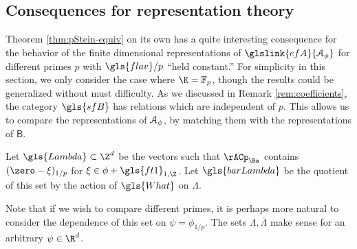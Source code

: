 \subsection{Consequences for representation theory}
\label{sec:cons-repr-theory}
Theorem \ref{thm:pStein-equiv} on its own has a quite interesting
consequence for  the behavior of the finite dimensional
representations of $\glslink{efA}{\EuScript{A}_\phi}$ for
different primes $p$ with  $\gls{flav}/p$  ``held constant.''  For simplicity in this section, we only consider the case where $\K=\mathbb{F}_p$, though the results could be
generalized without must difficulty.  As we discussed in Remark \ref{rem:coefficients}, the
category $\gls{sfB}$ has relations which are independent of $p$.
This allows us to compare the representations of $\EuScript{A}_\phi$,
by matching them with the representations of $\mathsf{B}.$ 


\begin{definition}\label{def:Lambda}
  Let $\gls{Lambda}\subset \Z^{d}$ be the vectors such that $\rACp_{\Ba}$
  contains $(\zero-\xi)_{1/p}$ for $\xi\in \phi+\gls{ft1}_{1,\Z}$.   Let $\gls{barLambda}$ be the quotient of this set by
  the action of $\gls{What}$ on $\Lambda$.
\end{definition}
Note that if we wish to compare different primes, it is perhaps more natural to consider the dependence of
this set on
$\psi=\phi_{1/p}$.  The sets $\Lambda,\bar{\Lambda}$ 
  make sense for an arbitrary $\psi \in \R^{d}$.

